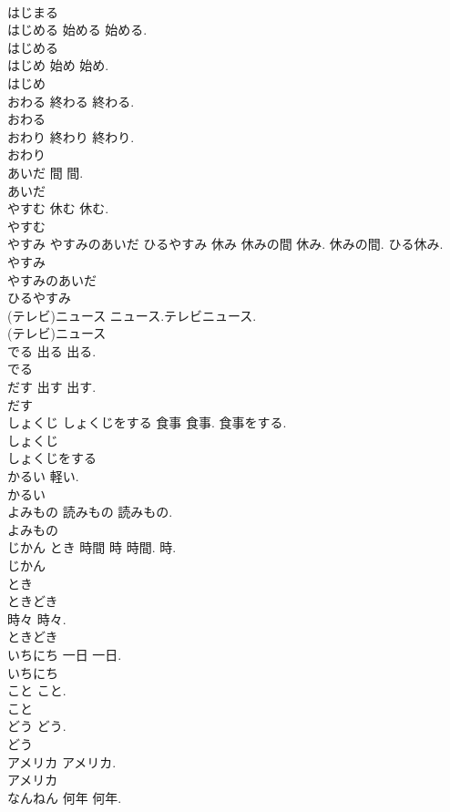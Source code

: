 \documentclass[8pt]{extreport}
\begin{document}
\begin{CJK}{UTF8}{min}
\\	はじまる
\\	はじめる	始める	始める.	
\\	はじめる
\\	はじめ	始め	始め.	
\\	はじめ
\\	おわる	終わる	終わる.	
\\	おわる
\\	おわり	終わり	終わり.	
\\	おわり
\\	あいだ	間	間.	
\\	あいだ
\\	やすむ	休む	休む.	
\\	やすむ
\\	やすみ やすみのあいだ ひるやすみ	休み 休みの間	休み. 休みの間. ひる休み.	
\\	やすみ
\\	やすみのあいだ
\\	ひるやすみ
\\	(テレビ)ニュース		ニュース.テレビニュース.	
\\	(テレビ)ニュース
\\	でる	出る	出る.	
\\	でる
\\	だす	出す	出す.	
\\	だす
\\	しょくじ しょくじをする	食事	食事. 食事をする.	
\\	しょくじ
\\	しょくじをする
\\	かるい		軽い.	
\\	かるい
\\	よみもの	読みもの	読みもの.	
\\	よみもの
\\	じかん とき	時間 時	時間. 時.	
\\	じかん
\\	とき
\\	ときどき	
\\	時々	時々.	
\\	ときどき
\\	いちにち	一日	一日.	
\\	いちにち
\\	こと		こと.	
\\	こと
\\	どう		どう.	
\\	どう
\\	アメリカ		アメリカ.	
\\	アメリカ
\\	なんねん	何年	何年.	

\end{CJK}
\end{document}
